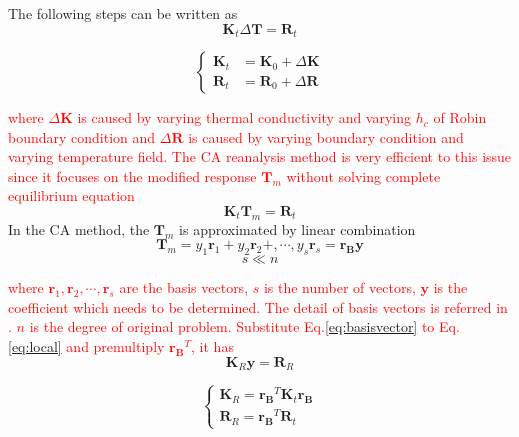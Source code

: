 \documentclass[review]{elsarticle}
\begin{document}
The following steps can be written as 
\begin{equation}
    \mathbf{K}_t \Delta \mathbf{T} = \mathbf{R}_t
    \label{eq:dyna-delta}
\end{equation}

\begin{equation*}
    \left\{\begin{array}{lr}
    \mathbf{K}_t &= \mathbf{K}_0+\Delta \mathbf{K}\\
    \mathbf{R}_t &= \mathbf{R}_0+\Delta \mathbf{R}
  \end{array}
\right.
\end{equation*}

\noindent \textcolor{red}{where $\Delta\mathbf{K}$ is caused by varying thermal conductivity and varying $h_c$ of Robin boundary condition and $\Delta \mathbf{R}$ is caused by varying boundary condition and varying temperature field. The CA reanalysis method is very efficient to this issue since it focuses on the modified response $\mathbf{T}_m$ without solving complete equilibrium equation}
\begin{equation}
    \mathbf{K}_t\mathbf{T}_m = \mathbf{R}_t
    \label{eq:local}
\end{equation}
In the CA method, the $\mathbf{T}_m$ is approximated by linear combination
\begin{equation}
    \mathbf{T}_m = y_1 \mathbf{r}_1+y_2 \mathbf{r}_2+,\cdots, y_s \mathbf{r}_s = \mathbf{r_B}\mathbf{y}
    \label{eq:basisvector}
\end{equation}
\begin{equation}
    s \ll n
\end{equation}

\noindent \textcolor{red}{where $\mathbf{r}_1, \mathbf{r}_2, \cdots, \mathbf{r}_s$ are the basis vectors, $s$ is the number of vectors, $\mathbf{y}$ is the coefficient which needs to be determined. The detail of basis vectors is referred in \cite{krizek1998finite, kirsch1998improved}. $n$ is the degree of original problem. Substitute Eq.\ref{eq:basisvector} to Eq.\ref{eq:local} and premultiply $\mathbf{r_B}^T$, it has}
\begin{equation}
    \mathbf{K}_R\mathbf{y}=\mathbf{R}_R
    \label{eq:reduced}
\end{equation}

\begin{equation*}
    \left\{\begin{array}{lr}
    \mathbf{K}_R = \mathbf{r_B}^T\mathbf{K}_t\mathbf{r_B}\\
    \mathbf{R}_R = \mathbf{r_B}^T\mathbf{R}_t
  \end{array}
\right.
\end{equation*}
\end{document}
